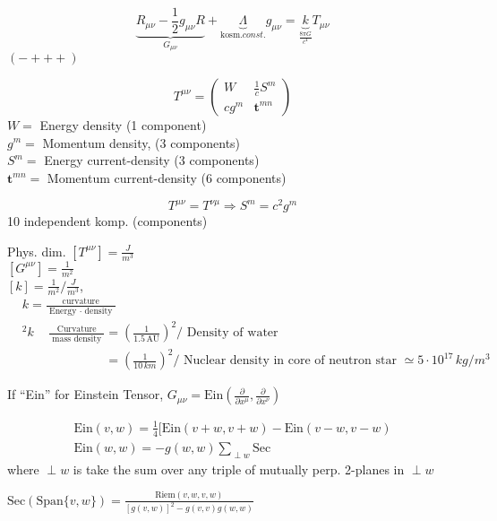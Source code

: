 \documentclass[10pt, twoside]{amsart}
\begin{document}
\begin{multicols*}{2}
\hrulefill

\[
\underbrace{R_{\mu \nu} - \frac{1}{2}g_{\mu \nu}R}_{G_{\mu \nu}} + \underbrace{\Lambda}_{\text{kosm.} const.} g_{\mu \nu} = \underbrace{k}_{ \frac{ 8 \pi G}{c^4} } T_{\mu \nu}   
\]
$(-+++)$

\[
T^{\mu \nu} = \left( \begin{matrix} W & \frac{1}{c} S^m \\
  c g^m & \mathbf{t}^{mn} \end{matrix} \right)
\]
$W = $ Energy density (1 component)\\
$g^m =$ Momentum density, (3 components) \\
$S^m = $ Energy current-density (3 components)\\
$\mathbf{t}^{mn} = $ Momentum current-density (6 components)

\[
T^{\mu \nu} = T^{\nu \mu} \Longrightarrow S^m = c^2 g^m
\]
10 independent komp. (components)

Phys. dim. $[T^{\mu \nu}] = \frac{J}{m^3} $ \\
\phantom{Phys. dim} $[G^{\mu \nu}] = \frac{1}{m^2}$ \\
\phantom{Phys. dim} $[k] = \frac{1}{m^2}/ \frac{J}{m^3}$, $\begin{aligned} & k = \frac{ \text{ curvature }}{ \text{ Energy } \cdot \text{ density }} \\
  & ^2 k  \quad \, \frac{ \text{ Curvature } }{ \text{ mass density }} = \left( \frac{1}{1.5 \, \text{AU} } \right)^2/ \text{ Density of water } \\
  & \phantom{^2 k  \quad \, \frac{ \text{ Curvature } }{ \text{ mass density }}} = \left( \frac{1}{ 10 \, km} \right)^2 / \text{ Nuclear density in core of neutron star  } \simeq 5 \cdot 10^{17} \, kg/m^3 \end{aligned}$

If ``Ein'' for Einstein Tensor, $G_{\mu \nu} = \text{Ein}\left( \frac{ \partial }{ \partial x^{\mu }}, \frac{ \partial }{ \partial x^{\nu }} \right)$

\[
\begin{gathered}
  \text{Ein}(v,w) = \frac{1}{4} [ \text{Ein}(v+w,v+w) - \text{Ein}(v-w,v-w)  \\
  \text{Ein}(w,w) = -g(w,w) \sum_{\perp w } \text{Sec}
\end{gathered}
\]
where $\perp w$ is take the sum over any triple of mutually perp. 2-planes in $\perp w$

$\text{Sec}(\text{Span}\lbrace v,w \rbrace) = \frac{ \text{Riem}(v,w,v,w) }{ [g(v,w)]^2 - g(v,v)g(w,w) }$


\end{multicols*}
\end{document}

